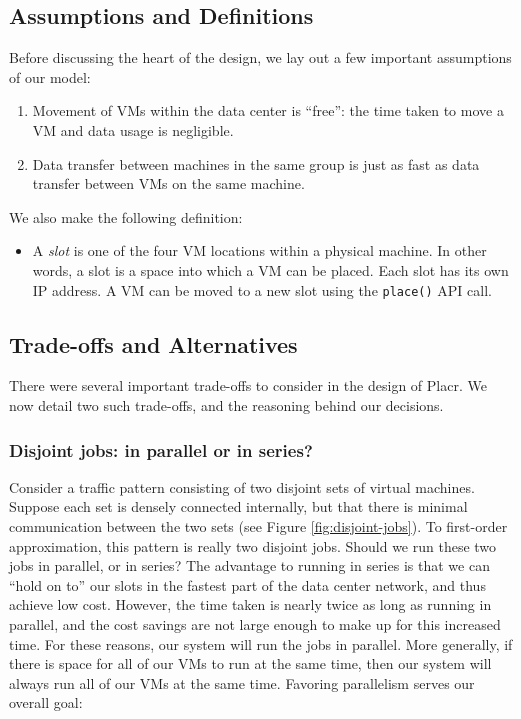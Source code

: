 \documentclass[11pt]{article}
\begin{document}
\subsection{Assumptions and Definitions}
Before discussing the heart of the design, we lay out a few important assumptions of our model:
\begin{enumerate}[noitemsep]
  \item Movement of VMs within the data center is ``free'': the time taken to move a VM and data usage is negligible.
  \item Data transfer between machines in the same group is just as fast as data transfer between VMs on the same machine.
\end{enumerate}
We also make the following definition:
\begin{itemize}
  \item A {\em slot} is one of the four VM locations within a physical machine.  In other words, a slot is a space into which a VM can be placed.  Each slot has its own IP address.  A VM can be moved to a new slot using the {\tt place()} API call.
\end{itemize}

\subsection{Trade-offs and Alternatives}\label{sec:tradeoffs}

There were several important trade-offs to consider in the design of Placr.  We now detail two such trade-offs, and the reasoning behind our decisions.

\subsubsection{Disjoint jobs: in parallel or in series?}

Consider a traffic pattern consisting of two disjoint sets of virtual machines.  Suppose each set is densely connected internally, but that there is minimal communication between the two sets (see Figure \ref{fig:disjoint-jobs}).  To first-order approximation, this pattern is really two disjoint jobs.  Should we run these two jobs in parallel, or in series?  The advantage to running in series is that we can ``hold on to'' our slots in the fastest part of the data center network, and thus achieve low cost.  However, the time taken is nearly twice as long as running in parallel, and the cost savings are not large enough to make up for this increased time.  For these reasons, our system will run the jobs in parallel.  More generally, if there is space for all of our VMs to run at the same time, then our system will always run all of our VMs at the same time.  Favoring parallelism serves our overall goal:
\end{document}
